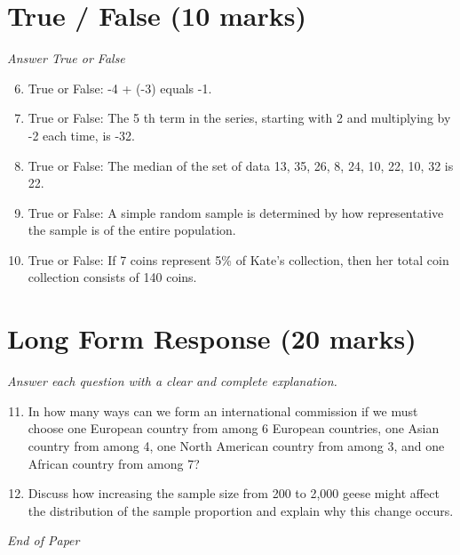 \documentclass[12pt]{article}
\begin{document}
\section*{True / False (10 marks)}
\textit{Answer True or False}
\begin{enumerate}[label=\arabic*.]
\setcounter{enumi}{5}
\item True or False: -4 + (-3) equals -1.
\item True or False: The 5 th term in the series, starting with 2 and multiplying by -2 each time, is -32.
\item True or False: The median of the set of data 13, 35, 26, 8, 24, 10, 22, 10, 32 is 22.
\item True or False: A simple random sample is determined by how representative the sample is of the entire population.
\item True or False: If 7 coins represent 5\% of Kate's collection, then her total coin collection consists of 140 coins.
\end{enumerate}

\section*{Long Form Response (20 marks)}
\textit{Answer each question with a clear and complete explanation.}
\begin{enumerate}[label=\arabic*.]
\setcounter{enumi}{10}
\item In how many ways can we form an international commission if we must choose one European country from among 6 European countries, one Asian country from among 4, one North American country from among 3, and one African country from among 7?
\item Discuss how increasing the sample size from 200 to 2,000 geese might affect the distribution of the sample proportion and explain why this change occurs.
\end{enumerate}

\vfill
\noindent\textit{End of Paper}
\end{document}
